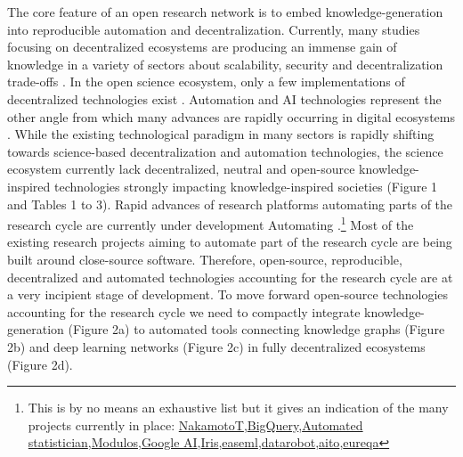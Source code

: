 \documentclass[10pt, a4paper, twocolumn]{article} %
\begin{document}
The core feature of an open research network is to embed
knowledge-generation into reproducible automation and
decentralization. Currently, many studies focusing on decentralized
ecosystems are producing an immense gain of knowledge in a variety of
sectors about scalability, security and decentralization trade-offs
\citep{Golem2016,Durov2017,Androulaki2018,OceanProtocolFoundation2018,BigchainDBGmbH2018}. In
the open science ecosystem, only a few implementations of
decentralized technologies exist \citep{Gunther2018}. Automation and
AI technologies represent the other angle from which many advances are
rapidly occurring in digital ecosystems
\citep{Schmidhuber:2015,Reichstein,Gil2019}. While the existing
technological paradigm in many sectors is rapidly shifting towards
science-based decentralization and automation technologies, the
science ecosystem currently lack decentralized, neutral and
open-source knowledge-inspired technologies strongly impacting
knowledge-inspired societies (Figure 1 and Tables 1 to 3). Rapid
advances of research platforms automating parts of the research cycle
are currently under development Automating
\citep{Steinruecken,Guimera}.\footnote{This is by no means an
  exhaustive list but it gives an indication of the many projects
  currently in place:
  \href{https://www.nterminal.com}{NakamotoT},\href{https://cloud.google.com/bigquery/}{BigQuery},\href{https://www.automaticstatistician.com/index/}{Automated
    statistician},\href{http://www.modulos.ai/}{Modulos},\href{https://ai.google/}{Google
    AI},\href{https://iris.ai}{Iris},\href{https://github.com/DS3Lab/easeml}{easeml},\href{https://www.datarobot.com/}{datarobot},\href{https://aito.ai/}{aito},\href{https://www.nutonian.com/products/eureqa/}{eureqa}}
Most of the existing research projects aiming to automate part of the
research cycle are being built around close-source
software. Therefore, open-source, reproducible, decentralized and
automated technologies accounting for the research cycle are at a very
incipient stage of development. To move forward open-source
technologies accounting for the research cycle we need to compactly
integrate knowledge-generation (Figure 2a) to automated tools
connecting knowledge graphs (Figure 2b) and deep learning networks
(Figure 2c) in fully decentralized ecosystems (Figure 2d).
\end{document}
